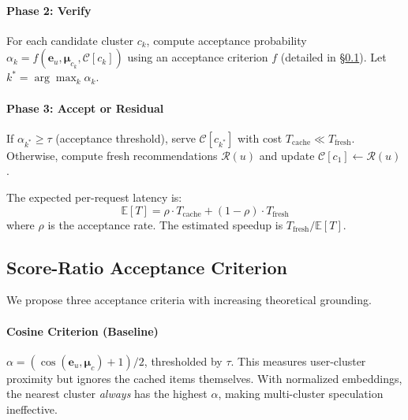 \documentclass{article}
\begin{document}
\paragraph{Phase 2: Verify}
For each candidate cluster $c_k$, compute acceptance probability $\alpha_k = f(\mathbf{e}_u, \boldsymbol{\mu}_{c_k}, \mathcal{C}[c_k])$ using an acceptance criterion $f$ (detailed in \S\ref{sec:acceptance}). Let $k^* = \arg\max_k \alpha_k$.

\paragraph{Phase 3: Accept or Residual}
If $\alpha_{k^*} \geq \tau$ (acceptance threshold), serve $\mathcal{C}[c_{k^*}]$ with cost $T_{\text{cache}} \ll T_{\text{fresh}}$. Otherwise, compute fresh recommendations $\mathcal{R}(u)$ and update $\mathcal{C}[c_1] \leftarrow \mathcal{R}(u)$.

The expected per-request latency is:
\begin{equation}
\mathbb{E}[T] = \rho \cdot T_{\text{cache}} + (1 - \rho) \cdot T_{\text{fresh}}
\label{eq:latency}
\end{equation}
where $\rho$ is the acceptance rate. The estimated speedup is $T_{\text{fresh}} / \mathbb{E}[T]$.

\subsection{Score-Ratio Acceptance Criterion}
\label{sec:acceptance}

We propose three acceptance criteria with increasing theoretical grounding.

\paragraph{Cosine Criterion (Baseline)}
$\alpha = (\cos(\mathbf{e}_u, \boldsymbol{\mu}_c) + 1) / 2$, thresholded by $\tau$. This measures user-cluster proximity but ignores the cached items themselves. With normalized embeddings, the nearest cluster \emph{always} has the highest $\alpha$, making multi-cluster speculation ineffective.
\end{document}

